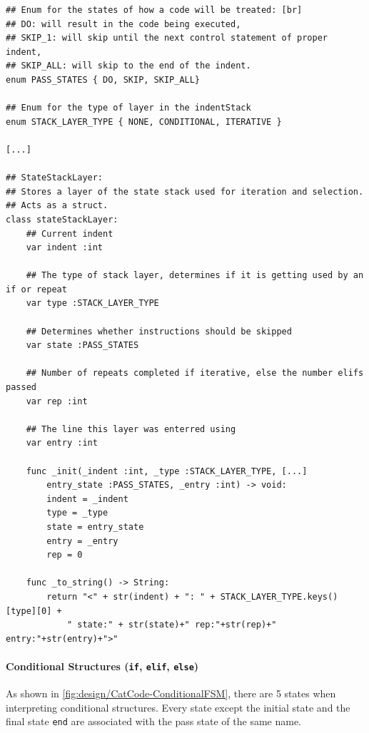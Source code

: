 \begin{fullwidthfigure} 
    \begin{tcolorbox}[boxrule=0.25mm]
    \begin{verbatim}
## Enum for the states of how a code will be treated: [br]
## DO: will result in the code being executed,
## SKIP_1: will skip until the next control statement of proper indent,
## SKIP_ALL: will skip to the end of the indent.
enum PASS_STATES { DO, SKIP, SKIP_ALL}

## Enum for the type of layer in the indentStack
enum STACK_LAYER_TYPE { NONE, CONDITIONAL, ITERATIVE }

[...]

## StateStackLayer:
## Stores a layer of the state stack used for iteration and selection.
## Acts as a struct.
class stateStackLayer:
    ## Current indent
    var indent :int

    ## The type of stack layer, determines if it is getting used by an if or repeat
    var type :STACK_LAYER_TYPE 

    ## Determines whether instructions should be skipped
    var state :PASS_STATES

    ## Number of repeats completed if iterative, else the number elifs passed
    var rep :int

    ## The line this layer was enterred using
    var entry :int

    func _init(_indent :int, _type :STACK_LAYER_TYPE, [...]
        entry_state :PASS_STATES, _entry :int) -> void:
        indent = _indent
        type = _type
        state = entry_state
        entry = _entry
        rep = 0
    
    func _to_string() -> String:
        return "<" + str(indent) + ": " + STACK_LAYER_TYPE.keys()[type][0] +
            " state:" + str(state)+" rep:"+str(rep)+" entry:"+str(entry)+">"
    \end{verbatim}
    \end{tcolorbox}
    \caption{\texttt{StateStackLayer} class definition from \texttt{cat\_thread.gd}}
    \label{fig:design/catCode-stateStackLayer}
\end{fullwidthfigure}

\paragraph{Conditional Structures (\texttt{if}, \texttt{elif}, \texttt{else})}

As shown in \autoref{fig:design/CatCode-ConditionalFSM}, there are 5 states when interpreting conditional structures. Every state except the initial state  and the final state \texttt{end} are associated with the pass state of the same name.

